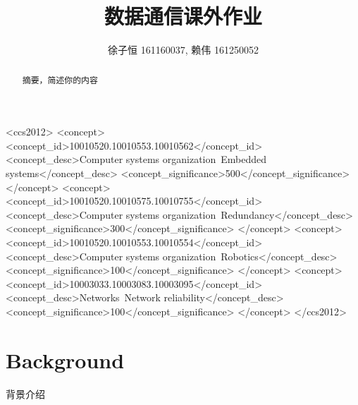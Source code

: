 \documentclass[sigconf]{acmart}
\begin{document}
\begin{CJK}{UTF8}{song}

\title{数据通信课外作业}

\author{徐子恒 161160037, 赖伟 161250052}



\begin{abstract}
摘要，简述你的内容
\end{abstract}

%
%
\begin{CCSXML}
<ccs2012>
 <concept>
  <concept_id>10010520.10010553.10010562</concept_id>
  <concept_desc>Computer systems organization~Embedded systems</concept_desc>
  <concept_significance>500</concept_significance>
 </concept>
 <concept>
  <concept_id>10010520.10010575.10010755</concept_id>
  <concept_desc>Computer systems organization~Redundancy</concept_desc>
  <concept_significance>300</concept_significance>
 </concept>
 <concept>
  <concept_id>10010520.10010553.10010554</concept_id>
  <concept_desc>Computer systems organization~Robotics</concept_desc>
  <concept_significance>100</concept_significance>
 </concept>
 <concept>
  <concept_id>10003033.10003083.10003095</concept_id>
  <concept_desc>Networks~Network reliability</concept_desc>
  <concept_significance>100</concept_significance>
 </concept>
</ccs2012>  
\end{CCSXML}





\maketitle

\section{Background} %
背景介绍


\end{CJK}
\end{document}
